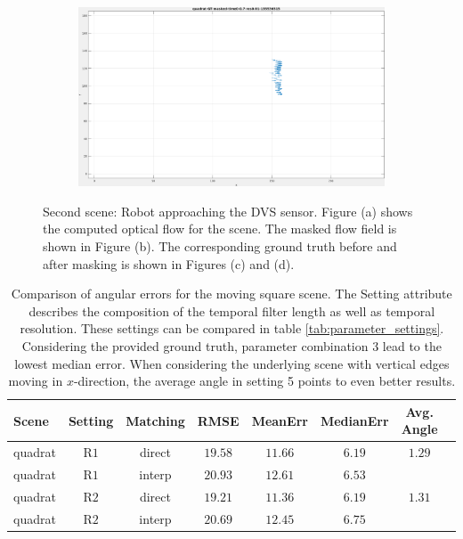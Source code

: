 \begin{figure}[tb]
\begin{subfigure}{.45\textwidth}
  \caption{}
\end{subfigure}
\begin{subfigure}{.45\textwidth}
  \centering
  \includegraphics[height=.6\linewidth]{figs/quadrat/quadrat-GT-masked-1.png}
  \caption{}
\end{subfigure}
\caption[First scene: Robot approaching the DVS sensor.]{Second scene: Robot approaching the DVS sensor.
Figure (a) shows the computed optical flow for the scene. 
The masked flow field is shown in Figure (b).
The corresponding ground truth before and after masking is shown in Figures (c) and (d).}
\label{fig:quadrat-snapshots}
\end{figure}


\begin{table}[tb]
	\centering
		\begin{tabular}{lccccccc}
Scene & Setting & Matching & RMSE & MeanErr & MedianErr & Avg. Angle \\
\hline  \hline
quadrat & R$1$ & direct & $19.58$ & $11.66$ & $6.19$ & $1.29$ & \\
quadrat & R$1$ & interp & $20.93$ & $12.61$ & $6.53$ &  & \\
quadrat & R$2$ & direct & $19.21$ & $11.36$ & $6.19$ & $1.31$ & \\
quadrat & R$2$ & interp & $20.69$ & $12.45$ & $6.75$ &  & \\
		\end{tabular}
	\caption[First scene: Comparison of angular errors for different parameters.]{Comparison of angular errors for the moving square scene.
	The Setting attribute describes the composition of the temporal filter length as well as temporal resolution.
	 These settings can be compared in table \ref{tab:parameter_settings}. Considering the provided ground truth, parameter combination 3 lead to the lowest median error. When considering the underlying scene with vertical edges moving in $x$-direction, the average angle in setting 5 points to even better results.}
	\label{tab:error_comparison_square}
\end{table}

